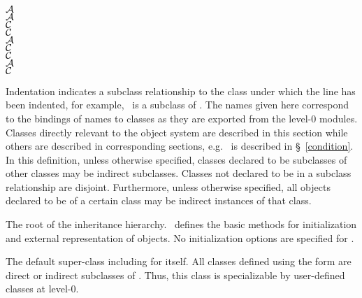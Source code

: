 \begin{optDefinition}
\begin{table}
{\begin{tabbing}
    \>$\cal A$  \\
    \>\>$\cal A$ \\
    \>\>\>$\cal C$ \\
    \>\>\>$\cal C$ \\
    \>$\cal A$  \\
    \>\>$\cal C$ \\
    \>\>$\cal C$ \\
    \>$\cal A$  \\
    \>\>$\cal C$ %
\end{tabbing}%
}%
\end{table}%
%
Indentation indicates a subclass relationship to the class under which the line
has been indented, for example, \ is a subclass of
.  The names given here correspond to the bindings of names to
classes as they are exported from the level-0 modules.  Classes directly
relevant to the object system are described in this section while others are
described in corresponding sections, e.g. \ is described in
\S~\ref{condition}.
%
In this definition, unless otherwise specified, classes declared to be
subclasses of other classes may be indirect subclasses. Classes not declared to
be in a subclass relationship are disjoint.  Furthermore, unless otherwise
specified, all objects declared to be of a certain class may be indirect
instances of that class.

%
The root of the inheritance hierarchy. \ defines the basic
methods for initialization and external representation of objects.  No
initialization options are specified for .

%
The default super-class including for itself.  All classes defined using the
 form are direct or indirect subclasses of
.  Thus, this class is specializable by user-defined classes at
level-0.
%
\end{optDefinition}

